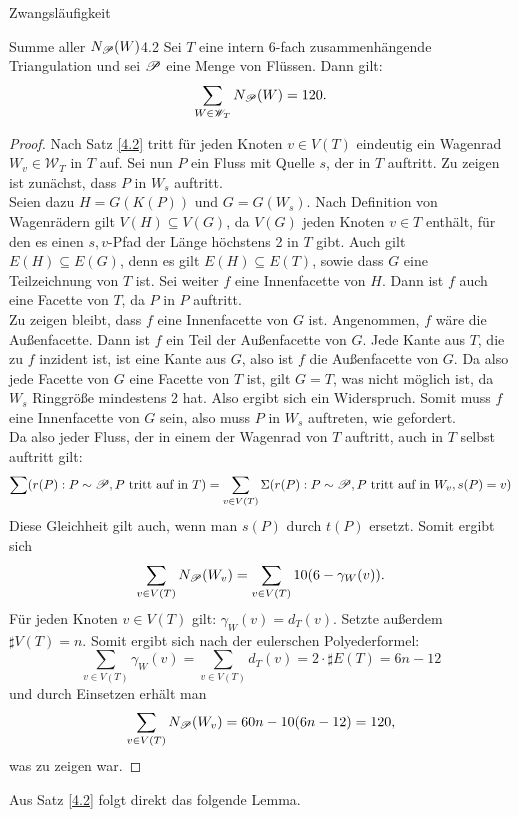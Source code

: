 \begin{section}{Zwangsläufigkeit}
 \begin{satzl}{Summe aller $N_{\mathscr{P}}(W)$}{4.2}
  Sei $T$ eine intern 6-fach zusammenhängende Triangulation und sei $\mathscr{P}$ eine Menge von Flüssen. Dann gilt:
  \[\sum_{W\in \mathscr{W}_T} N_{\mathscr{P}}(W) = 120\text{.}\]
 \end{satzl}
 \begin{proof}
  Nach Satz \ref{4.2} tritt für jeden Knoten $v \in V(T)$ eindeutig ein Wagenrad $W_v \in \mathscr{W}_T$ in $T$ auf. Sei nun $P$ ein Fluss mit Quelle $s$, der in $T$ auftritt. Zu zeigen ist zunächst, dass $P$ in $W_s$ auftritt.\\
  Seien dazu $H=G(K(P))$ und $G=G(W_s)$. Nach Definition von Wagenrädern gilt $V(H) \subseteq V(G)$, da $V(G)$ jeden Knoten $v \in T$ enthält, für den es einen $s,v$-Pfad   der Länge höchstens 2 in $T$ gibt. Auch gilt $E(H) \subseteq E(G)$, denn es gilt $E(H) \subseteq E(T)$, sowie dass $G$ eine Teilzeichnung von $T$ ist. Sei weiter $f$ eine Innenfacette von $H$. Dann ist $f$ auch eine Facette von $T$, da $P$ in $P$ auftritt.\\
  Zu zeigen bleibt, dass $f$ eine Innenfacette von $G$ ist. Angenommen, $f$ wäre die Außenfacette. Dann ist $f$ ein Teil der Außenfacette von $G$. Jede Kante aus $T$, die zu $f$ inzident ist, ist eine Kante aus $G$, also ist $f$ die Außenfacette von $G$. Da also jede Facette von $G$ eine Facette von $T$ ist, gilt $G=T$, was nicht möglich ist, da $W_s$ Ringgröße mindestens 2 hat. Also ergibt sich ein Widerspruch. Somit muss $f$ eine Innenfacette von $G$ sein, also muss $P$ in $W_s$ auftreten, wie gefordert.\\
  Da also jeder Fluss, der in einem der Wagenrad von $T$ auftritt, auch in $T$ selbst auftritt gilt:
  \[\sum (r(P):P\sim \mathscr{P}, P \text{ tritt auf in } T) = \sum_{v\in V(T)} \Sigma (r(P):P\sim \mathscr{P}, P \text{ tritt auf in } W_v,s(P)=v)\]
  Diese Gleichheit gilt auch, wenn man $s(P)$ durch $t(P)$ ersetzt. Somit ergibt sich
  \[\sum_{v\in V(T)} N_{\mathscr{P}}(W_v) = \sum_{v\in V(T)} 10(6-\gamma_W(v))\text{.}\]
  Für jeden Knoten $v \in V(T)$ gilt: $\gamma_W(v) = d_T(v)$. Setzte außerdem $\sharp V(T) = n$. Somit ergibt sich nach der eulerschen Polyederformel:
  \[\sum_{v\in V(T)} \gamma_W(v) = \sum_{v\in V(T)} d_T(v) = 2\cdot \sharp E(T) = 6n -12\]
  und durch Einsetzen erhält man
  \[\sum_{v\in V(T)} N_{\mathscr{P}}(W_v) = 60n - 10(6n - 12) = 120\text{,}\]
  was zu zeigen war.
 \end{proof}

 Aus Satz \ref{4.2} folgt direkt das folgende Lemma.
 

\end{section}
